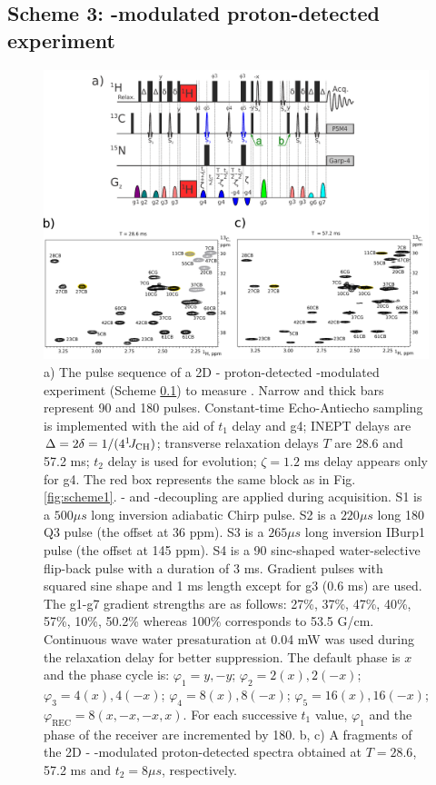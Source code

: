 \documentclass[twocolumn]{svjour3}           %
\begin{document}
\subsection{Scheme 3: \oneJch-modulated proton-detected experiment}
\label{subseq:scheme3}

\begin{figure}
  \includegraphics[width=1.0\textwidth]{Fig3}
  \caption{
    a) The pulse sequence of a 2D \hlab-\clab{} proton-detected 
    \oneJch-modulated experiment (Scheme \ref{subseq:scheme3}) 
    to measure \gtwoCH. Narrow and thick bars represent 90\degree{} 
    and 180\degree{} pulses. Constant-time \clab{} Echo-Antiecho 
    sampling is implemented with the aid of $t_1$ delay and g4; 
    INEPT delays are $\Delta = 2\delta = 1/(4 ^1\!J_\text{CH})$; 
    transverse relaxation delays $T$ are 28.6 and 57.2 ms; 
    $t_2$ delay is used for \oneJch{} evolution; $\zeta = 1.2$ ms 
    delay appears only for g4. The red box represents the same block 
    as in Fig. \ref{fig:scheme1}. \nlab- and \clab-decoupling are applied 
    during acquisition. 
    S1 is a $500 \mu s$ long \clab{} inversion adiabatic Chirp pulse. 
    S2 is a $220 \mu s$ long 180\degree{} Q3 pulse (the offset at 36 ppm). 
    S3 is a $265 \mu s$ long inversion IBurp1 pulse (the offset at 145 ppm).
    S4 is a 90\degree{} sinc-shaped water-selective \hlab{} flip-back pulse with a duration of 3 ms.
    Gradient pulses with squared sine shape and 1 ms length except for g3 
    (0.6 ms) are used. The g1-g7 gradient strengths are as follows: 
    27\%, 37\%, 47\%, 40\%, 57\%, 10\%, 50.2\% whereas 100\% corresponds to 53.5 G/cm. Continuous wave water presaturation at 0.04 mW was used during the relaxation delay for better suppression.
    The default phase is $x$ and the phase cycle is: 
    $\varphi_1 = y, -y$; 
    $\varphi_2 = 2(x), 2(-x)$; 
    $\varphi_3 = 4(x), 4(-x)$; 
    $\varphi_4 = 8(x), 8(-x)$; 
    $\varphi_5 = 16(x), 16(-x)$; 
    $\varphi_\text{REC} = 8(x, -x, -x, x)$. 
    For each successive $t_1$ value, $\varphi_1$ and the phase of the receiver are incremented by 180\degree. 
    b, c) A fragments of the 2D \hlab-\clab{} \oneJch-modulated proton-detected spectra obtained at $T = 28.6$, 57.2 ms and $t_2 = 8 \mu s$, 
    respectively.
  }
  \label{fig:scheme3}
\end{figure}
\end{document}
